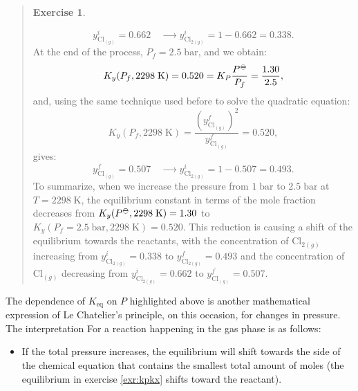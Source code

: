 \documentclass[
]{book}
\providecommand{\tightlist}{%
  \setlength{\itemsep}{0pt}\setlength{\parskip}{0pt}}
\theoremstyle{definition}
\theoremstyle{definition}
\theoremstyle{definition}
\newtheorem{exercise}{Exercise}[chapter]
\theoremstyle{remark}
\begin{document}
\begin{quote}
\begin{exercise}
\begin{itemize}
  \begin{equation}
  y_{\mathrm{Cl}_{(g)}}^i= 0.662 \quad \xrightarrow \qquad y_{\mathrm{Cl}_{2(g)}}^i=1-0.662 = 0.338.
  \end{equation}
  At the end of the process, \(P_f=2.5\;\text{bar}\), and we obtain:
  \begin{equation}
  K_y (P_f,2298\;\text{K}) = 0.520 = K_P \frac{P^{-\kern-6pt{\ominus}\kern-6pt-}}{P_f} = \frac{1.30}{2.5},
  \end{equation}
  and, using the same technique used before to solve the quadratic equation:
  \begin{equation}
  K_y (P_f,2298\;\text{K})=\frac{\left(y^f_{\mathrm{Cl}_{(g)}}\right)^2}{y^f_{\mathrm{Cl}_{(g)}}} = 0.520,
  \end{equation}
  gives:
  \begin{equation}
  y_{\mathrm{Cl}_{(g)}}^f=0.507 \quad \xrightarrow \qquad y_{\mathrm{Cl}_{2(g)}}^i=1-0.507 = 0.493.
  \end{equation}
  To summarize, when we increase the pressure from \(1\;\text{bar}\) to \(2.5\;\text{bar}\) at \(T=2298\;\text{K}\), the equilibrium constant in terms of the mole fraction decreases from \(K_y(P^{-\kern-6pt{\ominus}\kern-6pt-},2298\;\text{K})=1.30\) to \(K_y(P_f=2.5\;\text{bar},2298\;\text{K})=0.520\). This reduction is causing a shift of the equilibrium towards the reactants, with the concentration of \(\text{Cl}_{2(g)}\) increasing from \(y_{\text{Cl}_{2(g)}}^i = 0.338\) to \(y_{\text{Cl}_{2(g)}}^f = 0.493\) and the concentration of \(\text{Cl}_{(g)}\) decreasing from \(y_{\text{Cl}_{2(g)}}^i = 0.662\) to \(y_{\text{Cl}_{(g)}}^f = 0.507\).
\end{itemize}
\end{exercise}
\end{quote}

The dependence of \(K_{\text{eq}}\) on \(P\) highlighted above is another mathematical expression of Le Chatelier's principle, on this occasion, for changes in pressure. The interpretation For a reaction happening in the gas phase is as follows:

\begin{itemize}
\tightlist
\item
  If the total pressure increases, the equilibrium will shift towards the side of the chemical equation that contains the smallest total amount of moles (the equilibrium in exercise \ref{exr:kpkx} shifts toward the reactant).
\end{itemize}
\end{document}
